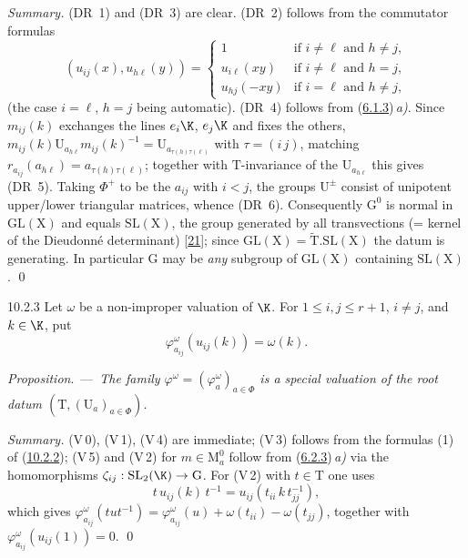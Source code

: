 \documentclass[12pt,a4paper,oneside,english]{smfart}
\makeatletter
\newcommand{\btanchor}[1]{\leavevmode\Hy@raisedlink{\hypertarget{bt:#1}{}}}
\newcommand{\btref}[1]{\hyperlink{bt:#1}{#1}}
\newcommand{\btbib}[1]{\hyperlink{bib:#1}{#1}}
\newcommand{\btunnum}[1]{\par\medskip\noindent\emph{#1}.\ ---\ \ignorespaces}
\theoremstyle{definition}
\theoremstyle{bt}
\makeatother
\begin{document}
\pf
\emph{Summary.} (DR~1) and (DR~3) are clear. (DR~2) follows from the commutator
formulas
\begin{equation*}
(u_{ij}(x),u_{h\ell}(y))=
\begin{cases}
1 & \text{if } i\neq\ell \text{ and } h\neq j,\\
u_{i\ell}(xy) & \text{if } i\neq\ell \text{ and } h=j,\\
u_{hj}(-xy) & \text{if } i=\ell \text{ and } h\neq j,
\end{cases}
\tag{1}
\end{equation*}
(the case $i=\ell$, $h=j$ being automatic). (DR~4) follows from
(\btref{6.1.3})\,\emph{a)}. Since $m_{ij}(k)$ exchanges the lines $e_i\K$, $e_j\K$ and
fixes the others, $m_{ij}(k)\mathrm{U}_{a_{h\ell}}m_{ij}(k)^{-1}
=\mathrm{U}_{a_{\tau(h)\tau(\ell)}}$ with $\tau=(i\,j)$, matching
$r_{a_{ij}}(a_{h\ell})=a_{\tau(h)\tau(\ell)}$; together with $\mathrm{T}$-invariance
of the $\mathrm{U}_{a_{h\ell}}$ this gives (DR~5). Taking $\Phi^{+}$ to be the
$a_{ij}$ with $i<j$, the groups $\mathrm{U}^{\pm}$ consist of unipotent
upper/lower triangular matrices, whence (DR~6). Consequently $\mathrm{G}^{0}$ is
normal in $\mathrm{GL}(\mathrm{X})$ and equals $\mathrm{SL}(\mathrm{X})$, the
group generated by all transvections (= kernel of the Dieudonné determinant)
[\btbib{21}]; since $\mathrm{GL}(\mathrm{X})=\widetilde{\mathrm{T}}.\mathrm{SL}(\mathrm{X})$
the datum is generating. In particular $\mathrm{G}$ may be \emph{any} subgroup
of $\mathrm{GL}(\mathrm{X})$ containing $\mathrm{SL}(\mathrm{X})$. \qed

\num{10.2.3}\btanchor{10.2.3} Let $\omega$ be a non-improper valuation of $\K$. For
$1\leqslant i,j\leqslant r+1$, $i\neq j$, and $k\in\K$, put
\[
\varphi^{\omega}_{a_{ij}}(u_{ij}(k))=\omega(k).
\]

\btunnum{Proposition}\emph{The family
$\varphi^{\omega}=(\varphi^{\omega}_a)_{a\in\Phi}$ is a special valuation of the
root datum $(\mathrm{T},(\mathrm{U}_a)_{a\in\Phi})$.}

\pf
\emph{Summary.} (V\,0), (V\,1), (V\,4) are immediate; (V\,3) follows from the
formulas (1) of (\btref{10.2.2}); (V\,5) and (V\,2) for $m\in\mathrm{M}^{0}_a$ follow
from (\btref{6.2.3})\,\emph{a)} via the homomorphisms
$\zeta_{ij}:\mathrm{SL}_2(\K)\to\mathrm{G}$. For (V\,2) with $t\in\mathrm{T}$ one
uses
\begin{equation*}
t\,u_{ij}(k)\,t^{-1}=u_{ij}(t_{ii}\,k\,t_{jj}^{-1}),
\tag{1}
\end{equation*}
which gives
$\varphi^{\omega}_{a_{ij}}(tut^{-1})=\varphi^{\omega}_{a_{ij}}(u)+\omega(t_{ii})-\omega(t_{jj})$,
together with $\varphi^{\omega}_{a_{ij}}(u_{ij}(1))=0$. \qed
\end{document}
